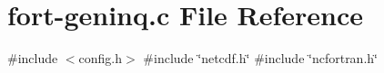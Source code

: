 \hypertarget{fort-geninq_8c}{}\section{fort-\/geninq.c File Reference}
\label{fort-geninq_8c}
{\ttfamily \#include $<$config.\+h$>$}\newline
{\ttfamily \#include \char`\"{}netcdf.\+h\char`\"{}}\newline
{\ttfamily \#include \char`\"{}ncfortran.\+h\char`\"{}}\newline
